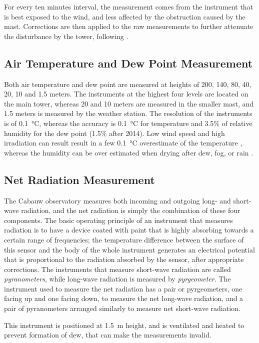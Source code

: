 \documentclass[12pt]{book}
\begin{document}
For every ten minutes interval, the measurement comes from the instrument that is best exposed to the wind, and less affected by the obstruction caused by the mast. Corrections are then applied to the raw measurements to further attenuate the disturbance by the tower, following \cite{winddistortion}.

\subsection{Air Temperature and Dew Point Measurement}
Both air temperature and dew point are measured at heights of 200, 140, 80, 40, 20, 10 and 1.5 meters. The instruments at the highest four levels are located on the main tower, whereas 20 and 10 meters are measured in the smaller mast, and 1.5 meters is measured by the weather station. The resolution of the instruments is of \SI{0.1}{\celsius}, whereas the accuracy is \SI{0.1}{\celsius} for temperature and 3.5\% of relative humidity for the dew point (1.5\% after 2014). Low wind speed and high irradiation can result result in a few \SI{0.1}{\celsius} overestimate of the temperature \citep{tempoverestimate}, whereas the humidity can be over estimated when drying after dew, fog, or rain \citep{cabauwinsitu}.

\subsection{Net Radiation Measurement}
The Cabauw observatory measures both incoming and outgoing long- and short-wave radiation, and the net radiation is simply the combination of these four components. The basic operating principle of an instrument that measures radiation is to have a device coated with paint that is highly absorbing towards a certain range of frequencies; the temperature difference between the surface of this sensor and the body of the whole instrument generates an electrical potential that is proportional to the radiation absorbed by the sensor, after appropriate corrections.  The instruments that measure short-wave radiation are called \emph{pyranometers}, while long-wave radiation is measured by \emph{pyrgeometer}.  The instrument used to measure the net radiation has a pair or pyrgeometers, one facing up and one facing down, to measure the net long-wave radiation, and a pair of pyranometers arranged similarly to measure net short-wave radiation.

This instrument is positioned at \SI{1.5}{\meter} height, and is ventilated and heated to prevent formation of dew, that can make the measurements invalid.
\end{document}
